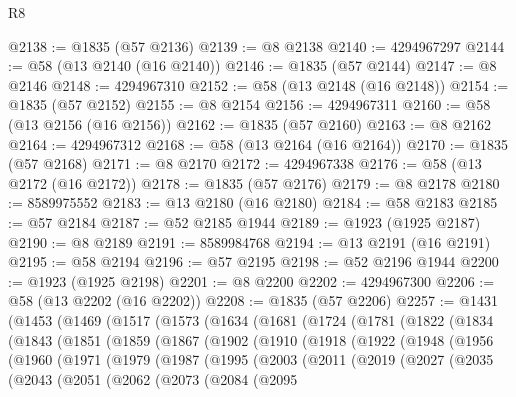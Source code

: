 \begin{lexlean}{R8}
\begin{coremodule}
@2138 := @1835 (@57 @2136)
@2139 := @8 @2138
@2140 := 4294967297
@2144 := @58 (@13 @2140 (@16 @2140))
@2146 := @1835 (@57 @2144)
@2147 := @8 @2146
@2148 := 4294967310
@2152 := @58 (@13 @2148 (@16 @2148))
@2154 := @1835 (@57 @2152)
@2155 := @8 @2154
@2156 := 4294967311
@2160 := @58 (@13 @2156 (@16 @2156))
@2162 := @1835 (@57 @2160)
@2163 := @8 @2162
@2164 := 4294967312
@2168 := @58 (@13 @2164 (@16 @2164))
@2170 := @1835 (@57 @2168)
@2171 := @8 @2170
@2172 := 4294967338
@2176 := @58 (@13 @2172 (@16 @2172))
@2178 := @1835 (@57 @2176)
@2179 := @8 @2178
@2180 := 8589975552
@2183 := @13 @2180 (@16 @2180)
@2184 := @58 @2183
@2185 := @57 @2184
@2187 := @52 @2185 @1944
@2189 := @1923 (@1925 @2187)
@2190 := @8 @2189
@2191 := 8589984768
@2194 := @13 @2191 (@16 @2191)
@2195 := @58 @2194
@2196 := @57 @2195
@2198 := @52 @2196 @1944
@2200 := @1923 (@1925 @2198)
@2201 := @8 @2200
@2202 := 4294967300
@2206 := @58 (@13 @2202 (@16 @2202))
@2208 := @1835 (@57 @2206)
@2257 := @1431
    (@1453
      (@1469
        (@1517
          (@1573
            (@1634
              (@1681
                (@1724
                  (@1781
                    (@1822
                      (@1834
                        (@1843
                          (@1851
                            (@1859
                              (@1867
                                (@1902
                                  (@1910
                                    (@1918
                                      (@1922
                                        (@1948
                                          (@1956
                                            (@1960
                                              (@1971
                                                (@1979
                                                  (@1987
                                                    (@1995
                                                      (@2003
                                                        (@2011
                                                          (@2019
                                                            (@2027
                                                              (@2035
                                                                (@2043
                                                                  (@2051
                                                                    (@2062
                                                                      (@2073
                                                                        (@2084
                                                                          (@2095

\end{coremodule}
\end{lexlean}

